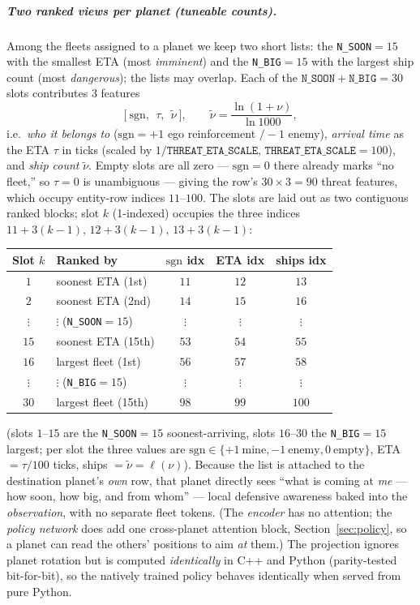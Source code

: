 \documentclass[11pt]{article}
\begin{document}
\subparagraph{Two ranked views per planet (tuneable counts).} Among the fleets assigned to a
planet we keep two short lists: the \texttt{N\_SOON}$=15$ with the smallest ETA (most
\emph{imminent}) and the \texttt{N\_BIG}$=15$ with the largest ship count (most \emph{dangerous});
the lists may overlap. Each of the $\texttt{N\_SOON}+\texttt{N\_BIG}=30$ slots contributes $3$ features
\begin{equation}
\big[\ \mathrm{sgn},\ \ \tau,\ \ \widetilde\nu\ \big],
\qquad \widetilde\nu=\frac{\ln(1+\nu)}{\ln 1000},
\end{equation}
i.e.\ \emph{who it belongs to} ($\mathrm{sgn}=+1$ ego reinforcement $/-1$ enemy), \emph{arrival
time} as the ETA $\tau$ in ticks (scaled by $1/\texttt{THREAT\_ETA\_SCALE}$, $\texttt{THREAT\_ETA\_SCALE}=100$),
and \emph{ship count} $\widetilde\nu$. Empty slots are all zero --- $\mathrm{sgn}=0$ there already
marks ``no fleet,'' so $\tau=0$ is unambiguous --- giving the row's $30\times 3=90$ threat features,
which occupy entity-row indices $11$--$100$. The slots are laid out as two contiguous ranked
blocks; slot $k$ (1-indexed) occupies the three indices $11+3(k-1),\,12+3(k-1),\,13+3(k-1)$:
\begin{center}\small
\begin{tabular}{@{}cl ccc@{}}
\toprule
Slot $k$ & Ranked by & $\mathrm{sgn}$ idx & ETA idx & ships idx \\
\midrule
$1$           & soonest ETA (1st)         & $11$ & $12$ & $13$ \\
$2$           & soonest ETA (2nd)         & $14$ & $15$ & $16$ \\
$\vdots$      & $\vdots$ (\texttt{N\_SOON}$=15$) & $\vdots$ & $\vdots$ & $\vdots$ \\
$15$          & soonest ETA (15th)        & $53$ & $54$ & $55$ \\
$16$          & largest fleet (1st)       & $56$ & $57$ & $58$ \\
$\vdots$      & $\vdots$ (\texttt{N\_BIG}$=15$)  & $\vdots$ & $\vdots$ & $\vdots$ \\
$30$          & largest fleet (15th)      & $98$ & $99$ & $100$ \\
\bottomrule
\end{tabular}
\end{center}
(slots $1$--$15$ are the \texttt{N\_SOON}$=15$ soonest-arriving, slots $16$--$30$ the
\texttt{N\_BIG}$=15$ largest; per slot the three values are $\mathrm{sgn}\in\{+1\ \text{mine},-1\
\text{enemy},0\ \text{empty}\}$, ETA $=\tau/100$ ticks, ships $=\widetilde\nu=\ell(\nu)$).
Because the list is attached to the destination planet's \emph{own} row, that planet
directly sees ``what is coming at \emph{me} --- how soon, how big, and from whom'' --- local
defensive awareness baked into the \emph{observation}, with no separate fleet tokens. (The
\emph{encoder} has no attention; the \emph{policy network} does add one cross-planet attention block,
Section~\ref{sec:policy}, so a planet can read the others' positions to aim \emph{at} them.) The
projection ignores planet rotation but is computed \emph{identically} in C++ and Python (parity-tested
bit-for-bit), so the natively trained policy behaves identically when served from pure Python.
\end{document}
